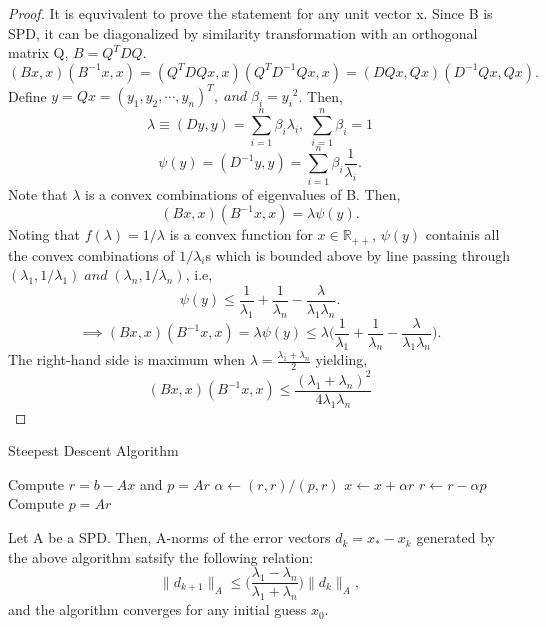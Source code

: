 \documentclass[10pt,a4paper]{article}
\begin{document}
\begin{proof}
It is equvivalent to prove the statement for any unit vector x. Since B is SPD, it can be diagonalized by similarity transformation with an orthogonal matrix Q, $B=Q^TDQ.$
$$(Bx,x)(B^{-1}x,x)=(Q^TDQx,x)(Q^TD^{-1}Qx,x)=(DQx,Qx)(D^{-1}Qx,Qx).$$
Define $y=Qx=(y_1,y_2,\cdots,y_n)^T,\;and\;\beta_i={y_i}^2$. Then,
$$\lambda\equiv (Dy,y) = \sum^n_{i=1}\beta_i\lambda_i,\;\sum^n_{i=1}\beta_i=1$$
$$\psi(y)=(D^{-1}y,y)=\sum^n_{i=1}\beta_i\frac{1}{\lambda_i}.$$
Note that $\lambda$ is a convex combinations of eigenvalues of B. Then,
$$(Bx,x)(B^{-1}x,x)=\lambda\psi(y).$$
Noting that $f(\lambda)=1/{\lambda}$ is a convex function for $x\in\mathbb{R}_{++}$, $\psi(y)$ containis all the convex combinations of $1/\lambda_i$s which is bounded above by line passing through $(\lambda_1,1/{\lambda_1})\;and\;(\lambda_n,1/{\lambda_n})$, i.e,
$$\psi(y)\le \frac{1}{\lambda_1}+\frac{1}{\lambda_n}-\frac{\lambda}{\lambda_1\lambda_n}.$$
$$\implies (Bx,x)(B^{-1}x,x)=\lambda\psi(y)\le \lambda\Big(\frac{1}{\lambda_1}+\frac{1}{\lambda_n}-\frac{\lambda}{\lambda_1\lambda_n}\Big).$$
The right-hand side is maximum when $\lambda=\frac{\lambda_1+\lambda_n}{2}$  yielding,
$$(Bx,x)(B^{-1}x,x)\le\frac{(\lambda_1+\lambda_n)^2}{4\lambda_1\lambda_n}$$
\end{proof}

\begin{algorithm}
\caption{Steepest Descent Algorithm}
\begin{algorithmic}[1]
\State Compute $r=b-Ax$ and $p=Ar$
\Repeat
	\State $\alpha\gets (r,r)/(p,r)$
	\State $x\gets x+\alpha r$
	\State $r\gets r-\alpha p$
	\State Compute $p=Ar$
\end{algorithmic}
\end{algorithm}

\begin{theorem}
Let A be a SPD. Then, A-norms of the error vectors $d_k=x_*-x_k$ generated by the above algorithm satsify the following relation:
$$\|d_{k+1}\|_A\le\Big(\frac{\lambda_1-\lambda_n}{\lambda_1+\lambda_n}\Big)\|d_k\|_A,$$
and the algorithm converges for any initial guess $x_0.$
\end{theorem}
\end{document}
